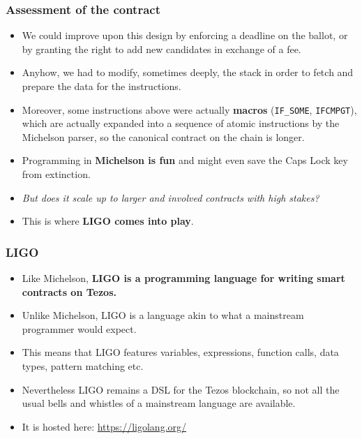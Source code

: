 \documentclass[compress,dvips,xcolor={dvipsnames},t]{beamer}
\begin{document}
\begin{frame}
  \frametitle{Assessment of the contract}

  \begin{itemize}

    \item We could improve upon this design by enforcing a deadline on
      the ballot, or by granting the right to add new candidates in
      exchange of a fee.

    \item Anyhow, we had to modify, sometimes deeply, the stack in
      order to fetch and prepare the data for the instructions.

    \item Moreover, some instructions above were actually
      \textbf{macros} (\texttt{IF\_SOME}, \texttt{IFCMPGT}), which are
      actually expanded into a sequence of atomic instructions by the
      Michelson parser, so the canonical contract on the chain is
      longer.

    \item Programming in \textbf{Michelson is fun} and might even save
      the Caps Lock key from extinction.

    \item \emph{But does it scale up to larger and involved contracts
      with high stakes?}

    \item This is where \textbf{LIGO comes into play}.

  \end{itemize}

\end{frame}


\begin{frame}
  \frametitle{LIGO}

  \begin{itemize}

    \item Like Michelson, \textbf{LIGO is a programming language for
      writing smart contracts on Tezos.}

    \item Unlike Michelson, LIGO is a language akin to what a
      mainstream programmer would expect.

    \item This means that LIGO features variables, expressions,
      function calls, data types, pattern matching etc.

    \item Nevertheless LIGO remains a DSL for the Tezos blockchain, so
      not all the usual bells and whistles of a mainstream language
      are available.

    \item It is hosted here: \url{https://ligolang.org/}

  \end{itemize}

\end{frame}
\end{document}
